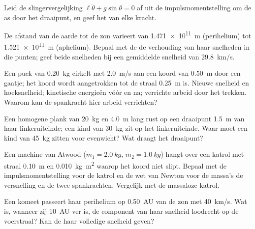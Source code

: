 \begin{exercise}[$\star\star$]\label{exo:b1:angular-momentum:5}
Leid de slingervergelijking $\ell\ddot\theta + g\sin\theta = 0$ af uit de
impulsmomentstelling om de as door het draaipunt, en geef het  van
elke kracht.
\end{exercise}

\begin{exercise}[$\star\star$]\label{exo:b1:angular-momentum:6}
De afstand van de aarde tot de zon varieert van \qty{1.471e11}{m} (perihelium)
tot \qty{1.521e11}{m} (aphelium). Bepaal met de  de verhouding
van haar snelheden in die punten; geef beide snelheden bij een gemiddelde snelheid van \qty{29.8}{km/s}.
\end{exercise}

\begin{exercise}[$\star\star$]\label{exo:b1:angular-momentum:7}
Een puck van \qty{0.20}{kg} cirkelt met \qty{2.0}{m/s} aan een koord van \qty{0.50}{m}
door een gaatje; het koord wordt aangetrokken tot de straal \qty{0.25}{m} is.
Nieuwe snelheid en hoeksnelheid; kinetische energieën vóór en na; verrichte arbeid
door het trekken. Waarom kan de spankracht hier arbeid verrichten?
\end{exercise}

\begin{exercise}[$\star\star$]\label{exo:b1:angular-momentum:8}
Een homogene plank van \qty{20}{kg} en \qty{4.0}{m} lang rust op een
draaipunt \qty{1.5}{m} van haar linkeruiteinde; een kind van \qty{30}{kg} zit op
het linkeruiteinde. Waar moet een kind van \qty{45}{kg} zitten voor evenwicht? Wat draagt
het draaipunt?
\end{exercise}

\begin{exercise}[$\star\star$]\label{exo:b1:angular-momentum:9}
Een machine van Atwood ($m_1 = \qty{2.0}{kg}$, $m_2 = \qty{1.0}{kg}$) hangt over
een katrol met straal \qty{0.10}{m} en  \qty{0.010}{kg.m^2}
waarop het koord niet slipt. Bepaal met de impulsmomentstelling
voor de katrol en de wet van Newton voor de massa's de versnelling
en de twee spankrachten. Vergelijk met de massaloze katrol.
\end{exercise}

\begin{exercise}[$\star\star\star$]\label{exo:b1:angular-momentum:10}
Een komeet passeert haar perihelium op \qty{0.50}{AU} van de zon met
\qty{40}{km/s}. Wat is, wanneer zij \qty{10}{AU} ver is, de component van
haar snelheid loodrecht op de voerstraal? Kan de 
haar volledige snelheid geven?
\end{exercise}

